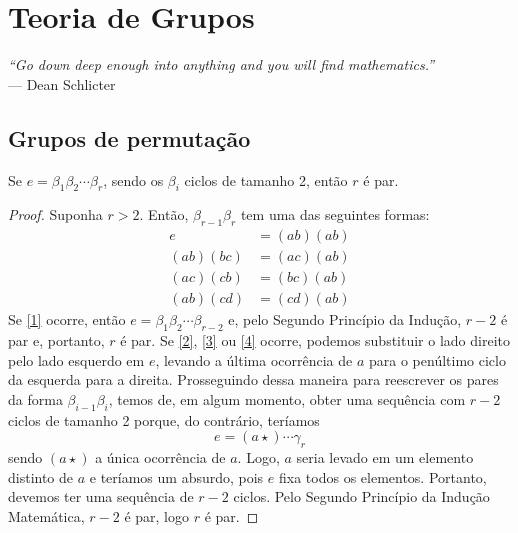 \chapter[Teoria de Grupos]{Teoria de Grupos}
\label{cap-1}
\chaptermark{}
%
\hfill%
\begin{minipage}{10cm}
\begin{flushright}
\rightskip=0.5cm
\textit{``Go down deep enough into anything and you will find mathematics.''}
\\[0.1cm]
\rightskip=0.5cm
--- Dean Schlicter
\end{flushright}
\end{minipage}

\section{Grupos de permutação}
    \begin{lemma}
	\label{lema identidade permutacoes}
        Se $e = \beta_{1}\beta_{2}\cdots\beta_{r}$, sendo os $\beta_i$
        ciclos de tamanho 2, então $r$ é par.
	\end{lemma}
	\begin{proof}
		Suponha $r>2$. Então, $\beta_{r-1}\beta_{r}$ tem uma das
		seguintes formas:
		\begin{align}
		    \label{1} e &= (ab)(ab) \\
		    \label{2} (ab)(bc) &= (ac)(ab) \\
		    \label{3} (ac)(cb) &= (bc)(ab) \\
		    \label{4} (ab)(cd) &= (cd)(ab)
		\end{align}
		Se \eqref{1} ocorre, então 
		$e = \beta_{1}\beta_{2}\cdots\beta_{r-2}$ e, pelo 
		Segundo Princípio da Indução, $r-2$ é par e, portanto, 
		$r$ é par. Se \eqref{2}, \eqref{3} ou \eqref{4} ocorre,
		podemos substituir o lado direito pelo lado esquerdo em
		$e$, levando a última ocorrência de $a$ para o penúltimo
		ciclo da esquerda para a direita. Prosseguindo dessa
		maneira para reescrever os pares da forma
		$\beta_{i-1}\beta_{i}$, temos de, em algum momento, 
		obter uma sequência com $r-2$ ciclos de tamanho 2 
		porque, do contrário, teríamos
		\begin{equation*}
		    e = (a \star)\cdots\gamma_{r}
		\end{equation*}
		sendo $(a\star)$ a única ocorrência de $a$. Logo, 
		$a$ seria levado em um elemento distinto de $a$ e 
		teríamos um absurdo, pois $e$ fixa todos os elementos.
		Portanto, devemos ter uma sequência de $r-2$ ciclos. 
		Pelo Segundo Princípio da Indução Matemática, 
		$r-2$ é par, logo $r$ é par.
	\end{proof}
